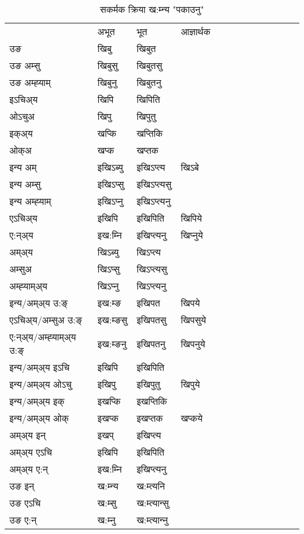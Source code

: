 \begin{table}[H]
\label{ip.vt} \centering
\caption{सकर्मक क्रिया  ख:म्‍न्य  "पकाउनु"  }
\begin{tabular}{l|l|l|l|l|l|l|l|l|l|l|l|l}  \toprule
&अभूत & भूत & आज्ञार्थक \\ 
उङ &खिबु &खिबुत \\ 
उङ अम्सु &खिबुसु &खिबुतसु \\ 
उङ अम्ह्‍याम् &खिबुनु &खिबुतनु \\ 
इऽचिअ्य &खिपि &खिपिति   \\ 
ओऽचुअ &खिपु &खिपुतु   \\ 
इक्अ्य &खप्कि &खप्‍तिकि   \\ 
ओक्अ &खप्क &खप्‍तक   \\ 
इन्य अम् & इखिऽब्यु  & इखिऽप्‍त्य &खिऽबे  \\ 
इन्य अम्सु & इखिऽप्सु  & इखिऽप्‍त्यसु   \\ 
इन्य अम्ह्‍याम् & इखिऽप्‍नु  & इखिऽप्‍त्यनु   \\ 
एऽचिअ्य & इखिपि & इखिपिति &खिपिये    \\ 
ए:न्अ्य & इख:म्‍नि  & इखिप्‍त्यनु &खिप्‍नुये  \\ 
अम्अ्य & खिऽब्यु  & खिऽप्‍त्य  \\ 
अम्सुअ & खिऽप्सु & खिऽप्‍त्यसु  \\ 
अम्ह्‍याम्अ्य & खिऽप्‍नु  & खिऽप्‍त्यनु \\ 
\midrule
इन्य/अम्अ्य उ:ङ्‌&इख:म्ङ & इखिपत &खिपये \\ 
एऽचिअ्य/अम्सुअ उ:ङ्‌ &इख:म्ङसु & इखिपतसु &खिपसुये \\ 
ए:न्अ्य/अम्ह्‍याम्अ्य उ:ङ्‌ &इख:म्ङनु & इखिपतनु &खिपनुये \\ 
इन्य/अम्अ्य इऽचि & इखिपि & इखिपिति    \\ 
इन्य/अम्अ्य ओऽचु & इखिपु & इखिपुतु  &खिपुये  \\ 
इन्य/अम्अ्य इक् & इखप्कि & इखप्‍तिकि   \\ 
इन्य/अम्अ्य ओक् & इखप्क & इखप्‍तक  &खप्कये  \\ 
अम्अ्य इन् & इखप् & इखिप्‍त्य   \\ 
अम्अ्य एऽचि & इखिपि & इखिपिति    \\ 
अम्अ्य ए:न् & इख:म्‍नि  & इखिप्‍त्यनु  \\ 
\midrule
उङ इन् & ख:म्‍न्य  & ख:म्त्यनि  \\ 
उङ एऽचि & ख:म्सु  & ख:म्त्यान्सु   \\ 
उङ ए:न्& ख:म्‍नु  & ख:म्त्यान्‍नु   \\ 
\bottomrule
\end{tabular}
\end{table}


